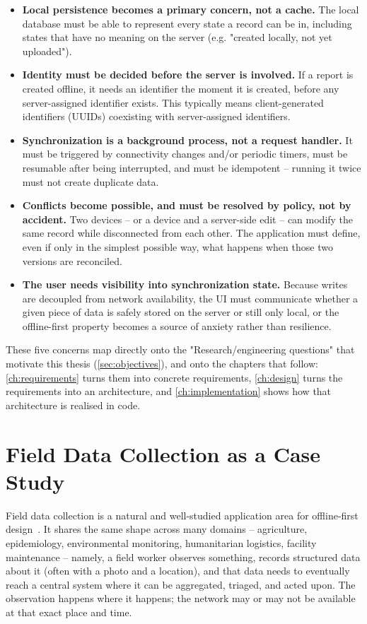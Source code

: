 \begin{itemize}
  \item \textbf{Local persistence becomes a primary concern, not a cache.}
  The local database must be able to represent every state a record can be
  in, including states that have no meaning on the server (e.g. "created
  locally, not yet uploaded").
  \item \textbf{Identity must be decided before the server is involved.}
  If a report is created offline, it needs an identifier the moment it is
  created, before any server-assigned identifier exists. This typically
  means client-generated identifiers (UUIDs) coexisting with
  server-assigned identifiers.
  \item \textbf{Synchronization is a background process, not a request
  handler.} It must be triggered by connectivity changes and/or periodic
  timers, must be resumable after being interrupted, and must be
  idempotent -- running it twice must not create duplicate data.
  \item \textbf{Conflicts become possible, and must be resolved by policy,
  not by accident.} Two devices -- or a device and a server-side edit --
  can modify the same record while disconnected from each other. The
  application must define, even if only in the simplest possible way, what
  happens when those two versions are reconciled.
  \item \textbf{The user needs visibility into synchronization state.}
  Because writes are decoupled from network availability, the UI must
  communicate whether a given piece of data is safely stored on the server
  or still only local, or the offline-first property becomes a source of
  anxiety rather than resilience.
\end{itemize}

These five concerns map directly onto the "Research/engineering questions"
that motivate this thesis (\cref{sec:objectives}), and onto the chapters
that follow: \cref{ch:requirements} turns them into concrete requirements,
\cref{ch:design} turns the requirements into an architecture, and
\cref{ch:implementation} shows how that architecture is realised in code.

\section{Field Data Collection as a Case Study}
\label{sec:case-study}

Field data collection is a natural and well-studied application area for
offline-first design~\cite{brunette2013odk,hartung2010open}. It shares the
same shape across many domains -- agriculture, epidemiology, environmental
monitoring, humanitarian logistics, facility maintenance -- namely, a field
worker observes something, records structured data about it (often with a
photo and a location), and that data needs to eventually reach a central
system where it can be aggregated, triaged, and acted upon. The
observation happens where it happens; the network may or may not be
available at that exact place and time.

